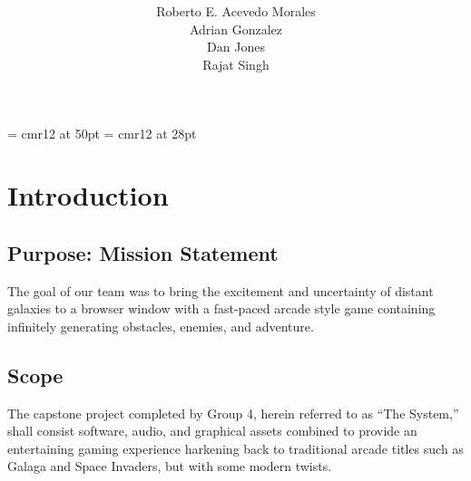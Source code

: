 \documentclass[12pt]{report}
\begin{document}

\font\titlefont = cmr12 at 50pt
\font\subtitlefont = cmr12 at 28pt
\title{ \\ \vspace{10pt} }
\author{Roberto E. Acevedo Morales \\ Adrian Gonzalez \\ Dan Jones \\ Rajat Singh}
\date{}
\maketitle

\tableofcontents \newpage

\section{Introduction}
	\subsection{Purpose: Mission Statement}
		The goal of our team was to bring the excitement and uncertainty of distant galaxies to a browser window with a fast-paced arcade style game containing infinitely generating obstacles, enemies, and adventure.
	\subsection{Scope}
		The capstone project completed by Group 4, herein referred to as ``The System,'' shall consist software, audio, and graphical assets combined to provide an entertaining gaming experience harkening back to traditional arcade titles such as Galaga and Space Invaders, but with some modern twists.
\end{document}
